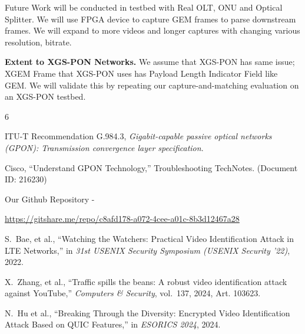 \documentclass[conference]{IEEEtran}
\begin{document}
Future Work will be conducted in testbed with Real OLT, ONU and Optical Splitter. We will use FPGA device to capture GEM frames to parse downstream frames. We will expand to more videos and longer captures with changing various resolution, bitrate.

\textbf{Extent to XGS-PON Networks.} We assume that XGS-PON has same issue; XGEM Frame that XGS-PON uses has Payload Length Indicator Field like GEM. We will validate this by repeating our capture-and-matching evaluation on an XGS-PON testbed.









%
%
%
\FloatBarrier
\begin{thebibliography}{6}

ITU-T Recommendation G.984.3, \emph{Gigabit-capable passive optical networks (GPON): Transmission convergence layer specification}.


Cisco, ``Understand GPON Technology,'' Troubleshooting TechNotes. (Document ID: 216230)

Our Github Repository - 

\url{https://gitshare.me/repo/c8afd178-a072-4cee-a01c-8b3d12467a28}

S.~Bae, et al.,
``Watching the Watchers: Practical Video Identification Attack in LTE Networks,''
in \emph{31st USENIX Security Symposium (USENIX Security '22)}, 2022. 

X.~Zhang, et al.,
``Traffic spills the beans: A robust video identification attack against YouTube,''
\emph{Computers \& Security}, vol.~137, 2024, Art. 103623. 

N.~Hu et al.,
``Breaking Through the Diversity: Encrypted Video Identification Attack Based on QUIC Features,''
in \emph{ESORICS 2024}, 2024. 

\end{thebibliography}





\end{document}
